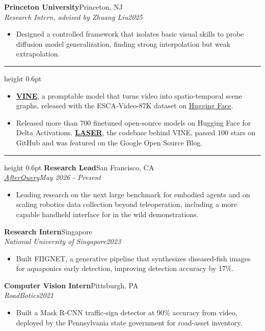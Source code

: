 \documentclass[letterpaper,11pt]{article}
\newenvironment{tight}{%
  \begin{itemize}\setlength{\itemsep}{0pt}\setlength{\parsep}{0pt}\setlength{\topsep}{1pt}}%
  {\end{itemize}}
\newcommand{\rsection}[1]{%
  \vspace{5pt}{\scshape\Large #1}\par\vspace{2pt}\hrule height 0.6pt\vspace{3pt}}
\newcommand{\linkhref}[2]{\textcolor{linkblue}{\href{#1}{#2}}}
\newcommand{\heading}[4]{\textbf{#1}\hfill #2\\\textit{\small #3}\hfill \textit{\small #4}}
\newcommand{\headingjob}[4]{\textbf{#1}\hfill #2\\\textit{#3}\hfill \textit{\small #4}}
\begin{document}
\vspace{3pt}
\heading{Princeton University}{Princeton, NJ}{Research Intern, advised by Zhuang Liu}{2025}
\begin{tight}
  \item Designed a controlled framework that isolates basic visual skills to probe diffusion model generalization, finding strong interpolation but weak extrapolation.
\end{tight}

\rsection{Open-Source and Datasets}
\begin{tight}
  \item \textbf{\linkhref{https://video-fm.github.io}{VINE}}, a promptable model that turns video into spatio-temporal scene graphs, released with the ESCA-Video-87K dataset on \linkhref{https://huggingface.co/video-fm/vine_v0}{Hugging Face}.
  \item Released more than 700 finetuned open-source models on Hugging Face for Delta Activations. \textbf{\linkhref{https://github.com/video-fm/LASER}{LASER}}, the codebase behind VINE, passed 100 stars on GitHub and was featured on the Google Open Source Blog.
\end{tight}

\rsection{Experience}
\headingjob{Research Lead}{San Francisco, CA}{\href{https://www.afterquery.com/}{AfterQuery}}{May 2026 - Present}
\begin{tight}
  \item Leading research on the next large benchmark for embodied agents and on scaling robotics data collection beyond teleoperation, including a more capable handheld interface for in the wild demonstrations.
\end{tight}

\vspace{3pt}
\headingjob{Research Intern}{Singapore}{National University of Singapore}{2023}
\begin{tight}
  \item Built FIIGNET, a generative pipeline that synthesizes diseased-fish images for aquaponics early detection, improving detection accuracy by 17\%.
\end{tight}

\vspace{3pt}
\headingjob{Computer Vision Intern}{Pittsburgh, PA}{RoadBotics}{2021}
\begin{tight}
  \item Built a Mask R-CNN traffic-sign detector at 90\% accuracy from video, deployed by the Pennsylvania state government for road-asset inventory.
\end{tight}
\end{document}
